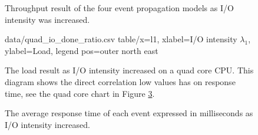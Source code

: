 \begin{figure}[h!]
    \centering

    \caption[Throughput result when I/O intensity was increased.]{Throughput
    result of the four event propagation models as I/O intensity was
    increased.}

    \label{fig:io_throughput}
\end{figure}

\begin{figure}[h!]
    \centering
    \performanceplot
    {data/quad_io_done_ratio.csv}
    {table/x=l1, xlabel=I/O intensity $\lambda_1$, ylabel=Load, legend pos=outer north east}

    \caption[Load result when I/O intensity was increased.]{The load result as
    I/O intensity increased on a quad core CPU. This diagram shows the direct
    correlation low values has on response time, see the quad core chart in
    Figure \ref{fig:io_avg_d0}.}

    \label{fig:quad_io_done_ratio}
\end{figure}

\begin{figure}[h!]
    \centering

    \caption[Response time result when I/O intensity was increased.]{The
    average response time of each event expressed in milliseconds as I/O
    intensity increased.}

    \label{fig:io_avg_d0}
\end{figure}
